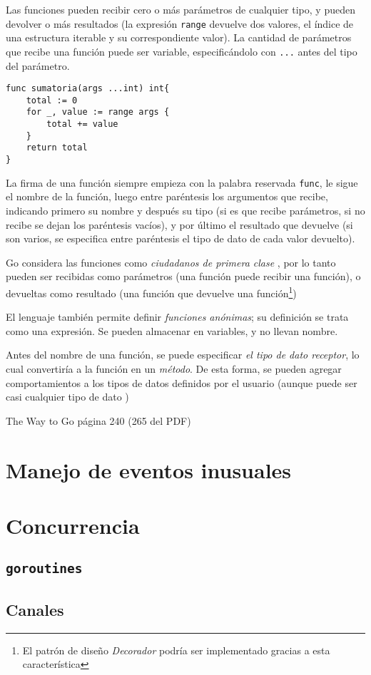 Las funciones pueden recibir cero o más parámetros de cualquier tipo, y pueden devolver o más resultados (la expresión \texttt{range} devuelve dos valores, el índice de una estructura iterable y su correspondiente valor). La cantidad de parámetros que recibe una función puede ser variable, especificándolo con \texttt{...} antes del tipo del parámetro.

\vspace*{5mm}
\begin{lstlisting}[title=Función con cantidad variable de argumentos]
func sumatoria(args ...int) int{
    total := 0
    for _, value := range args {
        total += value
    }
    return total
}
\end{lstlisting}

La firma de una función siempre empieza con la palabra reservada \texttt{func}, le sigue el nombre de la función, luego entre paréntesis los argumentos que recibe, indicando primero su nombre y después su tipo (si es que recibe parámetros, si no recibe se dejan los paréntesis vacíos), y por último el resultado que devuelve (si son varios, se especifica entre paréntesis el tipo de dato de cada valor devuelto). 

Go considera las funciones como \emph{ciudadanos de primera clase} \autocite{Wikipedia:first-class-citizen}, por lo tanto pueden ser recibidas como parámetros (una función puede recibir una función), o devueltas como resultado (una función que devuelve una función\footnote{El patrón de diseño \emph{Decorador} podría ser implementado gracias a esta característica}) 

El lenguaje también permite definir \emph{funciones anónimas}; su definición se trata como una expresión. Se pueden almacenar en variables, y no llevan nombre. 

Antes del nombre de una función, se puede especificar \emph{el tipo de dato receptor}, lo cual convertiría a la función en un \emph{método}. De esta forma, se pueden agregar comportamientos a los tipos de datos definidos por el usuario (aunque puede ser casi cualquier tipo de dato \autocite{TheWayToGo:Methods})

\Large The Way to Go página 240 (265 del PDF)

\section{Manejo de eventos inusuales}


\section{Concurrencia}
\subsection{\texttt{goroutines}}
\subsection{Canales}













\clearpage
\printbibliography



